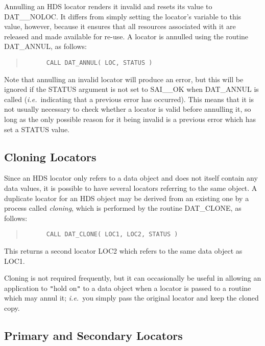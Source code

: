 \documentclass[11pt]{article}
\newcommand{\htmlref}[2]{#1}
\newcommand{\xlabel}[1]{}
\newcommand{\qt}[1]{``#1''}
\newcommand{\st}[1]{{\em{#1}}}
\renewcommand{\qt}[1]{{\tt{"}}#1{\tt{"}}}
\begin{document}
Annulling an HDS locator renders it invalid and resets its value to
DAT\_\_NOLOC.  It differs from simply setting the locator's variable
to this value, however, because it ensures that all resources
associated with it are released and made available for re-use. A
locator is annulled using the routine \htmlref{DAT\_ANNUL}{DAT_ANNUL},
as follows:

\small
\begin{quote}
\begin{verbatim}
      CALL DAT_ANNUL( LOC, STATUS )
\end{verbatim}
\end{quote}
\normalsize

Note that annulling an invalid locator will produce an error, but this
will be ignored if the STATUS argument is not set to SAI\_\_OK when
DAT\_ANNUL is called (\st{i.e.}\ indicating that a previous error has
occurred). This means that it is not usually necessary to check
whether a locator is valid before annulling it, so long as the only
possible reason for it being invalid is a previous error which has set
a STATUS value.

\subsection{\xlabel{cloning_locators}Cloning Locators}

Since an HDS locator only refers to a data object and does not itself
contain any data values, it is possible to have several locators
referring to the same object.  A duplicate locator for an HDS object
may be derived from an existing one by a process called \st{cloning},
which is performed by the routine \htmlref{DAT\_CLONE}{DAT_CLONE}, as
follows:

\small
\begin{quote}
\begin{verbatim}
      CALL DAT_CLONE( LOC1, LOC2, STATUS )
\end{verbatim}
\end{quote}
\normalsize

This returns a second locator LOC2 which refers to the same data
object as LOC1.

Cloning is not required frequently, but it can occasionally be useful
in allowing an application to \qt{hold on} to a data object when a
locator is passed to a routine which may \htmlref{annul}{sect:annul}
it; \st{i.e.}\ you simply pass the original locator and keep the
cloned copy.

\subsection{\xlabel{primary_and_secondary_locators}\label{sect:primary}Primary and Secondary Locators}
\end{document}
